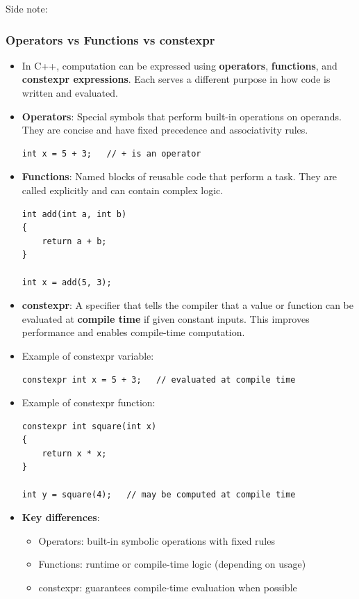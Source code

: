 \documentclass[10pt]{article}
\begin{document}
\newpage

Side note:
\subsubsection{Operators vs Functions vs constexpr}

\begin{itemize}
	\item In C++, computation can be expressed using \textbf{operators}, \textbf{functions}, and \textbf{constexpr expressions}. Each serves a different purpose in how code is written and evaluated.

	\item \textbf{Operators}: Special symbols that perform built-in operations on operands. They are concise and have fixed precedence and associativity rules.
	\begin{verbatim}
int x = 5 + 3;   // + is an operator
	\end{verbatim}

	\item \textbf{Functions}: Named blocks of reusable code that perform a task. They are called explicitly and can contain complex logic.
	\begin{verbatim}
int add(int a, int b)
{
    return a + b;
}

int x = add(5, 3);
	\end{verbatim}

	\item \textbf{constexpr}: A specifier that tells the compiler that a value or function can be evaluated at \textbf{compile time} if given constant inputs. This improves performance and enables compile-time computation.

	\item Example of constexpr variable:
	\begin{verbatim}
constexpr int x = 5 + 3;   // evaluated at compile time
	\end{verbatim}

	\item Example of constexpr function:
	\begin{verbatim}
constexpr int square(int x)
{
    return x * x;
}

int y = square(4);   // may be computed at compile time
	\end{verbatim}

	\item \textbf{Key differences}:
	\begin{itemize}
		\item Operators: built-in symbolic operations with fixed rules
		\item Functions: runtime or compile-time logic (depending on usage)
		\item constexpr: guarantees compile-time evaluation when possible
	\end{itemize}


\end{itemize}
\end{document}
